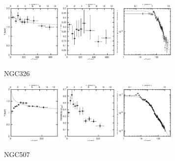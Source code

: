 \documentclass[structabstract]{aa}
\begin{document}
\begin{figure}[h]
   \centering
   \includegraphics[width=0.26\textwidth]{tprofile_ngc326.eps}
   \includegraphics[width=0.26\textwidth]{zprofile_ngc326.eps}
   \includegraphics[width=0.26\textwidth]{sbps_ngc326.eps}
   \caption{NGC326}
   \label{fig:tprofngc326}%
\end{figure}
\clearpage
\begin{figure}[h]
   \centering
   \includegraphics[width=0.26\textwidth]{tprofile_ngc507.eps}
   \includegraphics[width=0.26\textwidth]{zprofile_ngc507.eps}
   \includegraphics[width=0.26\textwidth]{sbps_ngc507.eps}
   \caption{NGC507}
   \label{fig:tprofngc507}%
\end{figure}
\end{document}
